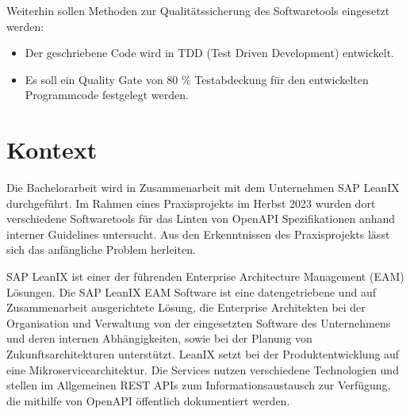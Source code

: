 Weiterhin sollen Methoden zur Qualitätssicherung des Softwaretools eingesetzt werden:
\begin{itemize}
    \item Der geschriebene Code wird in TDD (Test Driven Development) entwickelt.
    \item Es soll ein Quality Gate von 80 \% Testabdeckung für den entwickelten Programmcode festgelegt werden.
\end{itemize}

\section{Kontext}
Die Bachelorarbeit wird in Zusammenarbeit mit dem Unternehmen SAP LeanIX durchgeführt. Im Rahmen eines Praxisprojekts im Herbst 2023 wurden dort verschiedene Softwaretools für das Linten von OpenAPI Spezifikationen anhand interner Guidelines untersucht. Aus den Erkenntnissen des Praxisprojekts lässt sich das anfängliche Problem herleiten.

SAP LeanIX ist einer der führenden Enterprise Architecture Management (EAM) Lösungen. Die SAP LeanIX EAM Software ist eine datengetriebene und auf Zusammenarbeit ausgerichtete Lösung, die Enterprise Architekten bei der Organisation und Verwaltung von der eingesetzten Software des Unternehmens und deren internen Abhängigkeiten, sowie bei der Planung von Zukunftsarchitekturen unterstützt. 
LeanIX setzt bei der Produktentwicklung auf eine Mikroservicearchitektur. Die Services nutzen verschiedene Technologien und stellen im Allgemeinen REST APIs zum Informationsaustausch zur Verfügung, die mithilfe von OpenAPI öffentlich dokumentiert werden.


